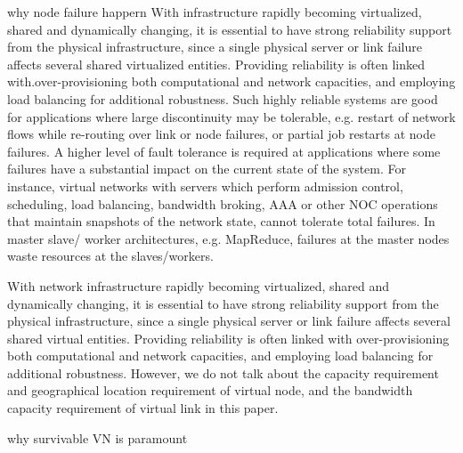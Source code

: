 why node failure happern
With infrastructure rapidly becoming virtualized, shared and dynamically changing, it is essential to have strong reliability support from the physical infrastructure, since a single physical server or link failure affects several shared virtualized entities. Providing reliability is often linked with.over-provisioning both computational and network capacities, and employing load balancing for additional robustness. Such highly reliable systems are good for applications where large discontinuity may be tolerable, e.g. restart of network flows while re-routing over link or node failures, or partial job restarts at node failures. A higher level of fault tolerance is required at applications where some failures have a substantial impact on the current state of the system. For instance, virtual networks with servers which perform admission control, scheduling, load balancing, bandwidth broking, AAA or other NOC operations that maintain snapshots of the network state, cannot tolerate total failures. In master slave/ worker architectures, e.g. MapReduce, failures at the master nodes waste resources at the slaves/workers.

With network infrastructure rapidly becoming  virtualized, shared and dynamically changing, it is essential to have strong reliability support from the physical infrastructure, since a single physical server or link failure affects several shared virtual entities. Providing reliability is often linked with over-provisioning both computational and network capacities, and employing load balancing for additional robustness. However, we do not talk about the capacity requirement and geographical location requirement of virtual node, and the bandwidth capacity requirement of virtual link in this paper.


why survivable VN is paramount

